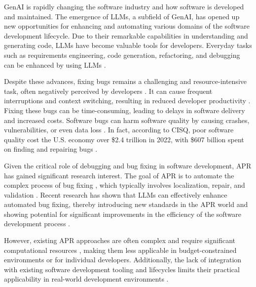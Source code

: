 \ac{GenAI} is rapidly changing the software industry and how software is developed and maintained. The emergence of \acp{LLM}, a subfield of \ac{GenAI}, has opened up new opportunities for enhancing and automating various domains of the software development lifecycle. Due to their remarkable capabilities in understanding and generating code, \acp{LLM} have become valuable tools for developers. Everyday tasks such as requirements engineering, code generation, refactoring, and debugging can be enhanced by using \acp{LLM} \cite{houLargeLanguageModels2024, puvvadiCodingAgentsComprehensive2025}.

Despite these advances, fixing bugs remains a challenging and resource-intensive task, often negatively perceived by developers \cite{winterHowDevelopersReally2023}. It can cause frequent interruptions and context switching, resulting in reduced developer productivity \cite{vasilescuSkyNotLimit2016}. Fixing these bugs can be time-consuming, leading to delays in software delivery and increased costs. %
Software bugs can harm software quality by causing crashes, vulnerabilities, or even data loss \cite{tihanyiNewEraSoftware2024}. In fact, according to CISQ, poor software quality cost the U.S. economy over \$2.4 trillion in 2022, with \$607 billion spent on finding and repairing bugs \cite{CostPoorSoftware}.

Given the critical role of debugging and bug fixing in software development, \ac{APR} has gained significant research interest. The goal of APR is to automate the complex process of bug fixing \cite{houLargeLanguageModels2024}, which typically involves localization, repair, and validation \cite{zhangEmpiricalStudyFactors2012, leeUnifiedDebuggingApproach2024, xiaAgentlessDemystifyingLLMbased2024, zhangPATCHEmpoweringLarge2025, wangEmpiricalResearchUtilizing2025}. Recent research has shown that \acp{LLM} can effectively enhance automated bug fixing, thereby introducing new standards in the APR world and showing potential for significant improvements in the efficiency of the software development process \cite{xiaAgentlessDemystifyingLLMbased2024, liuMarsCodeAgentAInative2024, yangSWEagentAgentComputerInterfaces2024, sobaniaAnalysisAutomaticBug2023, xiaAutomatedProgramRepair2024, huCanGPTO1Kill2024}.

However, existing APR approaches are often complex and require significant computational resources \cite{rondonEvaluatingAgentbasedProgram2025}, making them less applicable in budget-constrained environments or for individual developers. Additionally, the lack of integration with existing software development tooling and lifecycles limits their practical applicability in real-world development environments \cite{chenUnveilingPitfallsUnderstanding2025, liuMarsCodeAgentAInative2024}.

